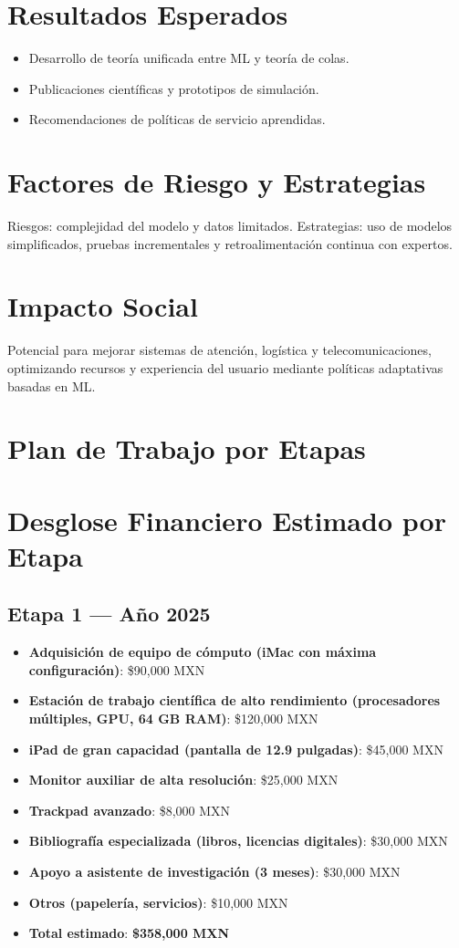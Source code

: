 \documentclass[12pt]{article}
\begin{document}
\section{Resultados Esperados}
\begin{itemize}
  \item Desarrollo de teoría unificada entre ML y teoría de colas.
  \item Publicaciones científicas y prototipos de simulación.
  \item Recomendaciones de políticas de servicio aprendidas.
\end{itemize}

\section{Factores de Riesgo y Estrategias}
Riesgos: complejidad del modelo y datos limitados. Estrategias: uso de modelos simplificados, pruebas incrementales y retroalimentación continua con expertos.

\section{Impacto Social}
Potencial para mejorar sistemas de atención, logística y telecomunicaciones, optimizando recursos y experiencia del usuario mediante políticas adaptativas basadas en ML.

\section{Plan de Trabajo por Etapas}

\section{Desglose Financiero Estimado por Etapa}

\subsection*{Etapa 1 — Año 2025}
\begin{itemize}
  \item \textbf{Adquisición de equipo de cómputo (iMac con máxima configuración)}: \$90,000 MXN
  \item \textbf{Estación de trabajo científica de alto rendimiento (procesadores múltiples, GPU, 64 GB RAM)}: \$120,000 MXN
  \item \textbf{iPad de gran capacidad (pantalla de 12.9 pulgadas)}: \$45,000 MXN
  \item \textbf{Monitor auxiliar de alta resolución}: \$25,000 MXN
  \item \textbf{Trackpad avanzado}: \$8,000 MXN
  \item \textbf{Bibliografía especializada (libros, licencias digitales)}: \$30,000 MXN
  \item \textbf{Apoyo a asistente de investigación (3 meses)}: \$30,000 MXN
  \item \textbf{Otros (papelería, servicios)}: \$10,000 MXN
  \item \textbf{Total estimado}: \textbf{\$358,000 MXN}
\end{itemize}
\end{document}
